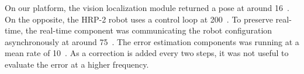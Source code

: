On our platform, the vision localization module returned a pose at
around 16~\hertz. On the opposite, the HRP-2 robot uses a control loop
at 200~\hertz. To preserve real-time, the real-time component was
communicating the robot configuration asynchronously at around
75~\hertz. The error estimation components was running at a mean rate
of 10~\hertz. As a correction is added every two steps, it was not
useful to evaluate the error at a higher frequency.


